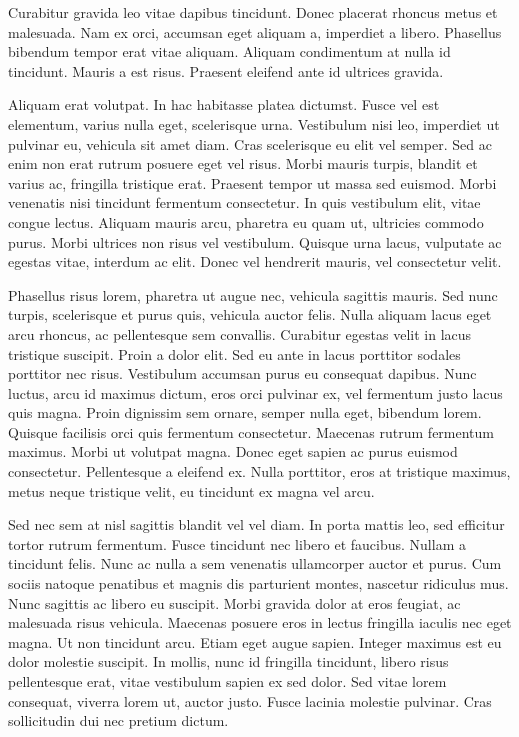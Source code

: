 \documentclass{llncs}
\begin{document}
Curabitur gravida leo vitae dapibus tincidunt. Donec placerat rhoncus metus et malesuada. Nam ex orci, accumsan eget aliquam a, imperdiet a libero. Phasellus bibendum tempor erat vitae aliquam. Aliquam condimentum at nulla id tincidunt. Mauris a est risus. Praesent eleifend ante id ultrices gravida.

Aliquam erat volutpat. In hac habitasse platea dictumst. Fusce vel est elementum, varius nulla eget, scelerisque urna. Vestibulum nisi leo, imperdiet ut pulvinar eu, vehicula sit amet diam. Cras scelerisque eu elit vel semper. Sed ac enim non erat rutrum posuere eget vel risus. Morbi mauris turpis, blandit et varius ac, fringilla tristique erat. Praesent tempor ut massa sed euismod. Morbi venenatis nisi tincidunt fermentum consectetur. In quis vestibulum elit, vitae congue lectus. Aliquam mauris arcu, pharetra eu quam ut, ultricies commodo purus. Morbi ultrices non risus vel vestibulum. Quisque urna lacus, vulputate ac egestas vitae, interdum ac elit. Donec vel hendrerit mauris, vel consectetur velit.

Phasellus risus lorem, pharetra ut augue nec, vehicula sagittis mauris. Sed nunc turpis, scelerisque et purus quis, vehicula auctor felis. Nulla aliquam lacus eget arcu rhoncus, ac pellentesque sem convallis. Curabitur egestas velit in lacus tristique suscipit. Proin a dolor elit. Sed eu ante in lacus porttitor sodales porttitor nec risus. Vestibulum accumsan purus eu consequat dapibus. Nunc luctus, arcu id maximus dictum, eros orci pulvinar ex, vel fermentum justo lacus quis magna. Proin dignissim sem ornare, semper nulla eget, bibendum lorem. Quisque facilisis orci quis fermentum consectetur. Maecenas rutrum fermentum maximus. Morbi ut volutpat magna. Donec eget sapien ac purus euismod consectetur. Pellentesque a eleifend ex. Nulla porttitor, eros at tristique maximus, metus neque tristique velit, eu tincidunt ex magna vel arcu.

Sed nec sem at nisl sagittis blandit vel vel diam. In porta mattis leo, sed efficitur tortor rutrum fermentum. Fusce tincidunt nec libero et faucibus. Nullam a tincidunt felis. Nunc ac nulla a sem venenatis ullamcorper auctor et purus. Cum sociis natoque penatibus et magnis dis parturient montes, nascetur ridiculus mus. Nunc sagittis ac libero eu suscipit. Morbi gravida dolor at eros feugiat, ac malesuada risus vehicula. Maecenas posuere eros in lectus fringilla iaculis nec eget magna. Ut non tincidunt arcu. Etiam eget augue sapien. Integer maximus est eu dolor molestie suscipit. In mollis, nunc id fringilla tincidunt, libero risus pellentesque erat, vitae vestibulum sapien ex sed dolor. Sed vitae lorem consequat, viverra lorem ut, auctor justo. Fusce lacinia molestie pulvinar. Cras sollicitudin dui nec pretium dictum.
\end{document}
